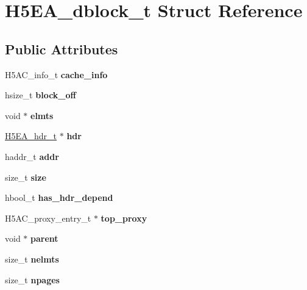 \hypertarget{struct_h5_e_a__dblock__t}{}\section{H5\+E\+A\+\_\+dblock\+\_\+t Struct Reference}
\label{struct_h5_e_a__dblock__t}
\subsection*{Public Attributes}
\begin{DoxyCompactItemize}
\item 
\mbox{\label{struct_h5_e_a__dblock__t_a40c62cf86af53fd2c066eb564cf59003}} 
H5\+A\+C\+\_\+info\+\_\+t {\bfseries cache\+\_\+info}
\item 
\mbox{\label{struct_h5_e_a__dblock__t_ab5d3780de004d242c10ac0edfce20618}} 
hsize\+\_\+t {\bfseries block\+\_\+off}
\item 
\mbox{\label{struct_h5_e_a__dblock__t_a65b3e6db286619a2a2834390c1f29f37}} 
void $\ast$ {\bfseries elmts}
\item 
\mbox{\label{struct_h5_e_a__dblock__t_a599ee53a5d9374d1b27bc7e0e0700ae5}} 
\hyperlink{struct_h5_e_a__hdr__t}{H5\+E\+A\+\_\+hdr\+\_\+t} $\ast$ {\bfseries hdr}
\item 
\mbox{\label{struct_h5_e_a__dblock__t_a536087b87aa40d0cbf8af16fcc91a6b9}} 
haddr\+\_\+t {\bfseries addr}
\item 
\mbox{\label{struct_h5_e_a__dblock__t_a853faf9f2bb2a2af73498f707a68cd53}} 
size\+\_\+t {\bfseries size}
\item 
\mbox{\label{struct_h5_e_a__dblock__t_a174d4bf358053229d2f5276a7bffd610}} 
hbool\+\_\+t {\bfseries has\+\_\+hdr\+\_\+depend}
\item 
\mbox{\label{struct_h5_e_a__dblock__t_ac61867561f4e50d83a6556cc69452457}} 
H5\+A\+C\+\_\+proxy\+\_\+entry\+\_\+t $\ast$ {\bfseries top\+\_\+proxy}
\item 
\mbox{\label{struct_h5_e_a__dblock__t_a3092dc6bc97d6cf53c9bc34353038f98}} 
void $\ast$ {\bfseries parent}
\item 
\mbox{\label{struct_h5_e_a__dblock__t_a5d667da34553c0eebb57b7a9637605ea}} 
size\+\_\+t {\bfseries nelmts}
\item 
\mbox{\label{struct_h5_e_a__dblock__t_a6912d2531042797144f82e1485b5b11d}} 
size\+\_\+t {\bfseries npages}
\end{DoxyCompactItemize}


